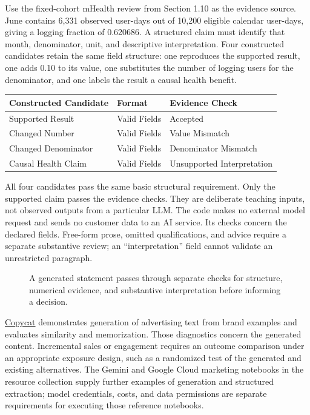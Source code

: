 Use the fixed-cohort mHealth review from Section 1.10 as the evidence
source. June contains 6,331 observed user-days out of 10,200 eligible
calendar user-days, giving a logging fraction of 0.620686. A structured
claim must identify that month, denominator, unit, and descriptive
interpretation. Four constructed candidates retain the same field
structure: one reproduces the supported result, one adds 0.10 to its
value, one substitutes the number of logging users for the denominator,
and one labels the result a causal health benefit.

\begin{table}[H]
\centering\small
\begin{tabular}{@{}lll@{}}
\toprule
Constructed Candidate & Format & Evidence Check \\
\midrule

Supported Result & Valid Fields & Accepted \\
Changed Number & Valid Fields & Value Mismatch \\
Changed Denominator & Valid Fields & Denominator Mismatch \\
Causal Health Claim & Valid Fields & Unsupported Interpretation \\
\bottomrule
\end{tabular}
\end{table}

All four candidates pass the same basic structural requirement. Only the
supported claim passes the evidence checks. They are deliberate teaching
inputs, not observed outputs from a particular LLM. The code makes no
external model request and sends no customer data to an AI service. Its
checks concern the declared fields. Free-form prose, omitted
qualifications, and advice require a separate substantive review; an
``interpretation'' field cannot validate an unrestricted paragraph.

\begin{figure}[htbp]
\centering

\caption{A generated statement passes through separate checks for structure, numerical evidence, and substantive interpretation before informing a decision.}\label{fig:M08_evidence_checks}
\end{figure}

\href{https://github.com/google-marketing-solutions/copycat}{Copycat}
demonstrates generation of advertising text from brand examples and
evaluates similarity and memorization. Those diagnostics concern the
generated content. Incremental sales or engagement requires an outcome
comparison under an appropriate exposure design, such as a randomized
test of the generated and existing alternatives. The Gemini and Google
Cloud marketing notebooks in the resource collection supply further
examples of generation and structured extraction; model credentials,
costs, and data permissions are separate requirements for executing
those reference notebooks.


